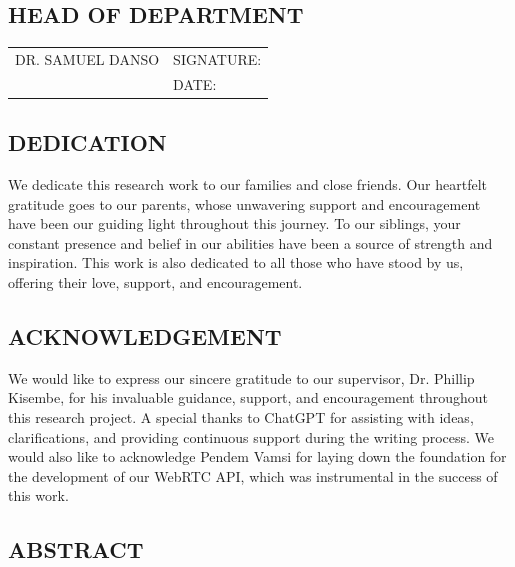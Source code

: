 \documentclass[a4paper,12pt]{article}  %
\begin{document}
\vspace{1cm}

\subsection*{HEAD OF DEPARTMENT}
\begin{tabular}{l l}
      \vspace{1cm}
      DR. SAMUEL DANSO & SIGNATURE: \underline{\hspace{5cm}} \\
                       & DATE: \underline{\hspace{5cm}}      \\
\end{tabular}
\newpage
\begin{center}
\section*{DEDICATION}
\end{center}
We dedicate this research work to our families and close friends. Our heartfelt gratitude goes to our parents, whose unwavering support and encouragement have been our guiding light throughout this journey. To our siblings, your constant presence and belief in our abilities have been a source of strength and inspiration. This work is also dedicated to all those who have stood by us, offering their love, support, and encouragement.\\
\newpage
\begin{center}
\section*{ACKNOWLEDGEMENT}
\end{center}
We would like to express our sincere gratitude to our supervisor, Dr. Phillip Kisembe, for his invaluable guidance, support, and encouragement throughout this research project. A special thanks to ChatGPT for assisting with ideas, clarifications, and providing continuous support during the writing process. We would also like to acknowledge Pendem Vamsi for laying down the foundation for the development of our WebRTC API, which was instrumental in the success of this work.\\
\newpage
\listoffigures
\newpage
\begin{center}
\section*{ABSTRACT}
\end{center}
\end{document}
